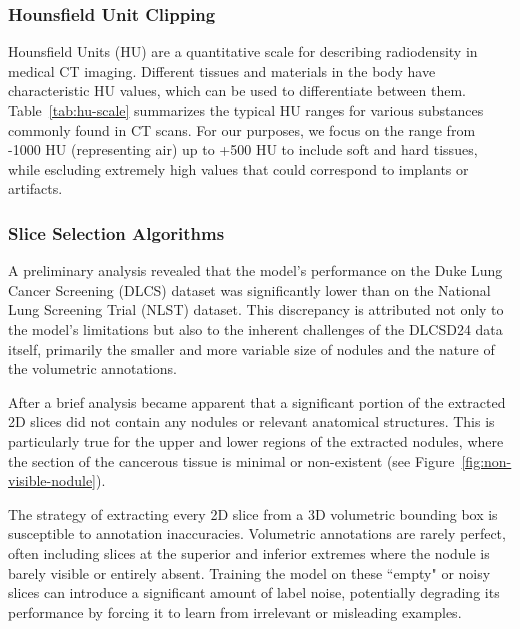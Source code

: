 \subsubsection{Hounsfield Unit Clipping}
\label{sec:hu-clipping}
Hounsfield Units (HU) are a quantitative scale for describing radiodensity in medical CT imaging. Different tissues and materials in the body have characteristic HU values, which can be used to differentiate between them. Table~\ref{tab:hu-scale} summarizes the typical HU ranges for various substances commonly found in CT scans. For our purposes, we focus on the range from -1000 HU (representing air) up to +500 HU to include soft and hard tissues, while escluding extremely high values that could correspond to implants or artifacts.


\subsubsection{Slice Selection Algorithms}
\label{sec:dataset_pruning}
A preliminary analysis revealed that the model's performance on the Duke Lung Cancer Screening (DLCS) dataset was significantly lower than on the National Lung Screening Trial (NLST) dataset. This discrepancy is attributed not only to the model's limitations but also to the inherent challenges of the DLCSD24 data itself, primarily the smaller and more variable size of nodules and the nature of the volumetric annotations.

After a brief analysis became apparent that a significant portion of the extracted 2D slices did not contain any nodules or relevant anatomical structures. This is particularly true for the upper and lower regions of the extracted nodules, where the section of the cancerous tissue is minimal or non-existent (see Figure~\ref{fig:non-visible-nodule}).



The strategy of extracting every 2D slice from a 3D volumetric bounding box is susceptible to annotation inaccuracies. Volumetric annotations are rarely perfect, often including slices at the superior and inferior extremes where the nodule is barely visible or entirely absent. Training the model on these ``empty" or noisy slices can introduce a significant amount of label noise, potentially degrading its performance by forcing it to learn from irrelevant or misleading examples.

